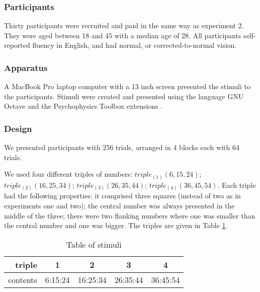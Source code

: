 \documentclass[man,floatmark]{apa}
\begin{document}
\subsubsection{Participants}
Thirty participants were recruited and paid in the same way as experiment 2. They were aged between 18 and 45 with a median age of 28. All participants self-reported fluency in English, and had normal, or corrected-to-normal vision.

\subsubsection{Apparatus}
A MacBook Pro laptop computer with a 13 inch screen presented the stimuli to the participants. Stimuli were created and presented using the language GNU Octave \cite{eaton:2002} and the Psychophysics Toolbox extensions \cite{ptbx1, ptbx2}.

\subsubsection{Design}
We presented participants with 256 trials, arranged in 4 blocks each with 64 trials.

We used four different triples of numbers: $triple_{(1)}(6,15,24)$; $triple_{(2)}(16,25,34)$; $triple_{(3)}(26,35,44)$; $triple_{(4)}(36,45,54)$. Each triple had the following properties: it comprised three squares (instead of two as in experiments one and two); the central number was always presented in the middle of the three; there were two flanking numbers where one was smaller than the central number and one was bigger. The triples are given in Table \ref{tablee3}.

\begin{table}[tbp]
\caption{Table of stimuli}
\label{tablee3}
\begin{tabular}{rcccc}
triple&1              &2              &3              & 4\\
              \hline
contents              &6:15:24  &16:25:34 &26:35:44&36:45:54 \\
\end{tabular}
\end{table}
\end{document}

